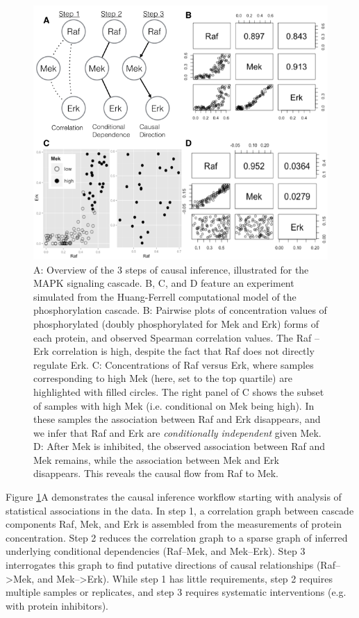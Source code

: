 \documentclass[journal=jacsat,manuscript=article]{achemso}
\def\added#1{{\color{blue} #1}}
\begin{document}
\begin{figure}[!tpb]
\centerline{\includegraphics[width=.95\textwidth]{figs/mapk.png}}
\caption{A: Overview of the 3 steps of causal inference, illustrated for the MAPK signaling cascade.    B, C, and D feature an experiment simulated from the Huang-Ferrell computational model of the phosphorylation cascade.  B: Pairwise plots of concentration values of phosphorylated (doubly phosphorylated for Mek and Erk) forms of each protein, and observed Spearman correlation values.  The Raf -- Erk correlation is high, despite the fact that Raf does not directly regulate Erk.  C: Concentrations of Raf versus Erk, where samples corresponding to high Mek (here, set to the top quartile) are highlighted \added{with filled circles}.  The right panel of C shows the subset of samples with high Mek (i.e. conditional on Mek being high). In these samples the association between Raf and Erk disappears, \added{and we infer} that Raf and Erk are {\it conditionally independent} given Mek.  D:  After Mek is inhibited, the observed association between Raf and Mek remains, while the association between Mek and Erk disappears. This reveals the causal flow from Raf to Mek. 
\label{mapkInference}}
\end{figure}


Figure \ref{mapkInference}A demonstrates the causal inference workflow starting with analysis of statistical associations in the data.  In step 1, a correlation graph between cascade components Raf, Mek, and Erk is assembled from the measurements of protein concentration.  Step 2 reduces the correlation graph to a \added{sparse graph of inferred} underlying conditional dependencies (Raf--Mek, and Mek--Erk).  Step 3 interrogates this graph to find putative directions of causal relationships (Raf-->Mek, and Mek-->Erk).  While step 1 has little requirements, step 2 requires multiple samples or replicates, and step 3 requires systematic interventions (e.g. with protein inhibitors). 
\end{document}
